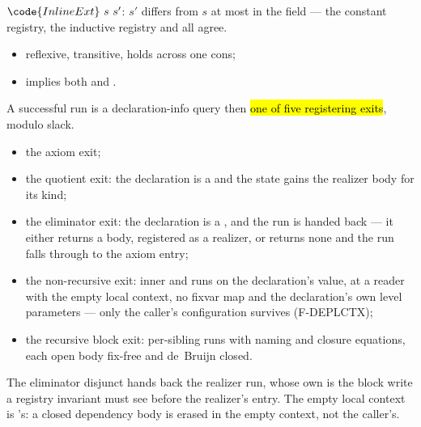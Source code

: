 \begin{definition}
\label{def:InlineExt}
\leanok
{}
 $\code{InlineExt}\ s\ s'$: $s'$ differs from $s$ at most in the  field ---
the constant registry, the inductive registry and  all agree.
\begin{itemize}
\item reflexive, transitive, holds across one  cons;
\item implies both  and .
\end{itemize}
\end{definition}
\begin{lemma}
\label{lem:run_visitMutual_decomp}
\leanok
{}
 A successful  run is a declaration-info query then \hl{one of five
registering exits}, modulo  slack.
\begin{itemize}
\item the axiom exit;
\item the quotient exit: the declaration is a  and the state gains the realizer body for
its kind;
\item the eliminator exit: the declaration is a , and the  run is
handed back --- it either returns a body, registered as a realizer, or returns none and the run falls
through to the axiom entry;
\item the non-recursive exit: inner  and  runs on the
declaration's value, at a reader with the empty local context, no fixvar map and the declaration's
own level parameters --- only the caller's configuration survives (F-DEPLCTX);
\item the recursive block exit: per-sibling runs with naming and closure equations, each open body
fix-free and de~Bruijn closed.
\end{itemize}
 The eliminator disjunct hands back the realizer run, whose own 
is the block write a registry invariant must see before the realizer's entry. The empty local context
is 's: a closed dependency body is erased in the empty context, not the
caller's.
\end{lemma}
